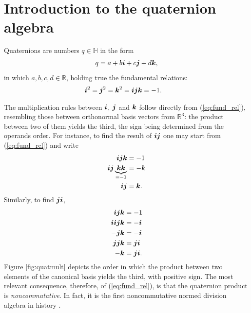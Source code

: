 \section{Introduction to the quaternion algebra}

Quaternions are numbers $q \in \mathbb{H}$ in the form
\begin{equation}
q = a + b\boldsymbol{i} + c\boldsymbol{j} + d\boldsymbol{k},
\label{eq:q}
\end{equation}
in which $a, b, c, d \in \mathbb{R}$, holding true the fundamental relations:
\begin{equation}
\label{eq:fund_rel}
\begin{aligned}
\boldsymbol{i} ^2 = \boldsymbol{j}^2 &=\boldsymbol{k}^2 = \boldsymbol{i} \boldsymbol{j} \boldsymbol{k} = -1.
\end{aligned}
\end{equation}

The multiplication rules between  $ \boldsymbol{i} $, $ \boldsymbol{j} $ and $ \boldsymbol{k} $ follow directly from (\ref{eq:fund_rel}), resembling those between orthonormal basis vectors from $ \mathbb{R}^3 $: the product between two of them yields the third, the sign being determined from the operands order. For instance, to find the result of $ \boldsymbol{i} \boldsymbol{j} $ one may start from (\ref{eq:fund_rel}) and write
\begin{equation}
\begin{aligned}
\boldsymbol{i} \boldsymbol{j} \boldsymbol{k} &= -1 \\
\boldsymbol{i} \boldsymbol{j} \underbrace{\boldsymbol{k} \boldsymbol{k}}_{= -1} &= -\boldsymbol{k} \\
\boldsymbol{i} \boldsymbol{j} &= \boldsymbol{k}.
\end{aligned}
\end{equation}
Similarly, to find $ \boldsymbol{j} \boldsymbol{i} $,
\begin{equation}
\begin{aligned}
\boldsymbol{i} \boldsymbol{j} \boldsymbol{k} &= -1 \\
\boldsymbol{i} \boldsymbol{i} \boldsymbol{j} \boldsymbol{k} &= -\boldsymbol{i} \\
- \boldsymbol{j} \boldsymbol{k} &= - \boldsymbol{i} \\
\boldsymbol{j} \boldsymbol{j} \boldsymbol{k} &=  \boldsymbol{j} \boldsymbol{i} \\
- \boldsymbol{k} &=  \boldsymbol{j} \boldsymbol{i}. \\
\end{aligned}
\end{equation}
Figure \ref{fig:quatmult} depicts the order in which the product between two elements of the canonical basis yields the third, with positive sign. The most relevant consequence, therefore, of (\ref{eq:fund_rel}), is that the quaternion product is \textit{noncommutative}. In fact, it is the first noncommutative normed division algebra in history \cite{kleiner2007history}.

